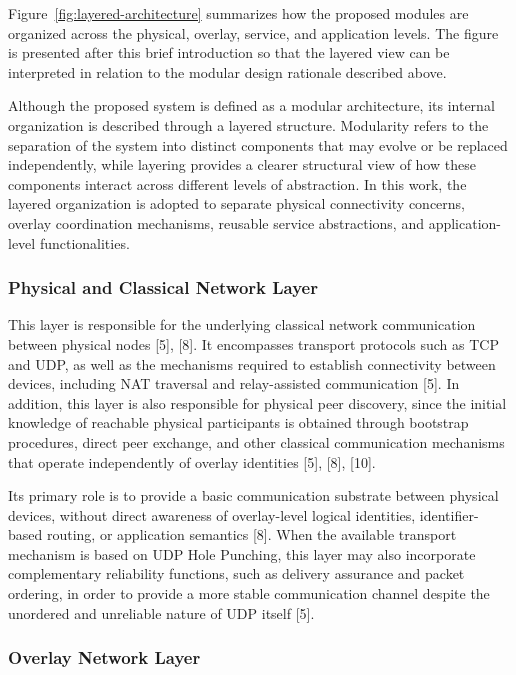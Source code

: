 \documentclass[12pt,a4paper]{article}
\begin{document}
Figure~\ref{fig:layered-architecture} summarizes how the proposed modules are organized across the physical, overlay, service, and application levels. The figure is presented after this brief introduction so that the layered view can be interpreted in relation to the modular design rationale described above.

\thesislayerstikz

Although the proposed system is defined as a modular architecture, its internal organization is described through a layered structure. Modularity refers to the separation of the system into distinct components that may evolve or be replaced independently, while layering provides a clearer structural view of how these components interact across different levels of abstraction. In this work, the layered organization is adopted to separate physical connectivity concerns, overlay coordination mechanisms, reusable service abstractions, and application-level functionalities.

\subsubsection{Physical and Classical Network Layer}

This layer is responsible for the underlying classical network communication between
physical nodes [5], [8]. It encompasses transport protocols such as TCP and UDP, as
well as the mechanisms required to establish connectivity between devices, including
NAT traversal and relay-assisted communication [5]. In addition, this layer is also
responsible for physical peer discovery, since the initial knowledge of reachable
physical participants is obtained through bootstrap procedures, direct peer exchange,
and other classical communication mechanisms that operate independently of overlay
identities [5], [8], [10].

Its primary role is to provide a basic communication substrate between physical
devices, without direct awareness of overlay-level logical identities, identifier-based
routing, or application semantics [8]. When the available transport mechanism is based
on UDP Hole Punching, this layer may also incorporate complementary reliability
functions, such as delivery assurance and packet ordering, in order to provide a more
stable communication channel despite the unordered and unreliable nature of UDP
itself [5].

\subsubsection{Overlay Network Layer}
\end{document}

